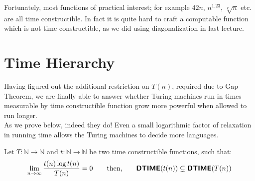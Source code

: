 \documentclass[usletter]{article}
\newcommand {\namedset}[1]     {\ensuremath{\mathbb{#1}}}
\newcommand {\family}[1]       {\ensuremath{\textnormal{\textsf{\textbf{#1}}}}}
\newcommand {\term}[1]      {\textsf{#1}}
\newcommand {\namethm}[1]   {\term{#1} Theorem}
\begin{document}
\noindent
Fortunately, most functions of practical interest; for example
$42n$, $n^{1.23}$, $\sqrt[k]{n}$ etc. are all \term{time constructible}. In fact
it is quite hard to craft a computable function which is not
\term{time constructible}, as we did using diagonalization in last lecture.


\section{Time Hierarchy}

Having figured out the additional restriction on $T(n)$, required due to
\namethm{Gap}, we are finally able to answer whether Turing machines run in
times measurable by \term{time constructible} function grow more powerful when
allowed to run longer. \\
As we prove below, indeed they do! Even a small logarithmic factor of relaxation
in running time allows the Turing machines to decide more languages.

\begin{theorem}
\label{dtime_hierarchy_theorem}
Let $T: \namedset{N} \to \namedset{N}$ and $t: \namedset{N} \to \namedset{N}$ be
two \term{time constructible} functions, such that:
$$
\lim_{n \to \infty} \frac{t(n) \log{t(n)}}{T(n)} = 0
\qquad \textnormal{then,}
\qquad \family{DTIME}(t(n)) \subsetneq \family{DTIME}(T(n))
$$
\end{theorem}
\end{document}
